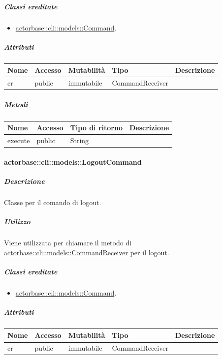 \documentclass{scalatekids-article}
\begin{document}
\subparagraph{Classi ereditate}

\begin{itemize}
\item \hyperref[sec:actorbase::cli::models::Command]{actorbase::cli::models::Command}.
\end{itemize}

\subparagraph{Attributi}

\begin{tabular}{| l | l | l | l | l |}
  \hline
  Nome & Accesso & Mutabilità & Tipo & Descrizione\\
  \hline
  cr & public & immutabile & CommandReceiver & \\
  \hline
\end{tabular}

\subparagraph{Metodi}

\begin{tabular}{| l | l | l | l |}
  \hline
  Nome & Accesso & Tipo di ritorno & Descrizione\\
  \hline
  execute & public & String & \\
  \hline
\end{tabular}

\paragraph{actorbase::cli::models::LogoutCommand}
\label{sec:actorbase::cli::models::LogoutCommand}

\subparagraph{Descrizione}

Classe per il comando di logout.

\subparagraph{Utilizzo}

Viene utilizzata per chiamare il metodo di
\hyperref[sec:actorbase::cli::models::CommandReceiver]{actorbase::cli::models::CommandReceiver} per il logout.

\subparagraph{Classi ereditate}

\begin{itemize}
\item \hyperref[sec:actorbase::cli::models::Command]{actorbase::cli::models::Command}.
\end{itemize}

\subparagraph{Attributi}

\begin{tabular}{| l | l | l | l | l |}
  \hline
  Nome & Accesso & Mutabilità & Tipo & Descrizione\\
  \hline
  cr & public & immutabile & CommandReceiver & \\
  \hline
\end{tabular}
\end{document}
